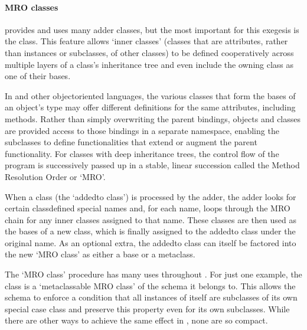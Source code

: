 \documentclass[letterpaper,10pt,english]{jupyterBook}
\begin{document}
\paragraph{MRO classes}
\label{\detokenize{content/chapter_03_everest/implementation:mro-classes}}
\sphinxAtStartPar
{} provides and uses many adder classes, but the most important for this exegesis is the  class. This feature allows ‘inner classes’ (classes that are attributes, rather than instances or subclasses, of other classes) to be defined cooperatively across multiple layers of a class’s inheritance tree \sphinxhyphen{} and even include the owning class as one of their bases.

\sphinxAtStartPar
In  and other object\sphinxhyphen{}oriented languages, the various classes that form the bases of an object’s type may offer different definitions for the same attributes, including methods. Rather than simply overwriting the parent bindings, objects and classes are provided access to those bindings in a separate namespace, enabling the subclasses to define functionalities that extend or augment the parent functionality. For classes with deep inheritance trees, the control flow of the program is successively passed up in a stable, linear succession called the Method Resolution Order or ‘MRO’.

\sphinxAtStartPar
When a class (the ‘added\sphinxhyphen{}to class’) is processed by the  adder, the adder looks for certain class\sphinxhyphen{}defined special names and, for each name, loops through the MRO chain for any inner classes assigned to that name. These classes are then used as the bases of a new class, which is finally assigned to the added\sphinxhyphen{}to class under the original name. As an optional extra, the added\sphinxhyphen{}to class can itself be factored into the new ‘MRO class’ as either a base or a metaclass.

\sphinxAtStartPar
The ‘MRO class’ procedure has many uses throughout . For just one example, the  class is a ‘metaclassable MRO class’ of the schema it belongs to. This allows the schema to enforce a condition that all instances of itself are subclasses of its own special case class \sphinxhyphen{} and preserve this property even for its own subclasses. While there are other ways to achieve the same effect in , none are so compact.
\end{document}
